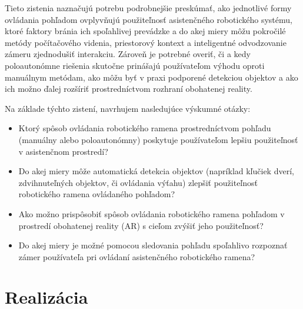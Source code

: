\documentclass[11pt,english,a4paper]{article}
\begin{document}
Tieto zistenia naznačujú potrebu podrobnejšie preskúmať, ako jednotlivé formy ovládania pohľadom ovplyvňujú použiteľnosť asistenčného robotického systému, ktoré faktory bránia ich spoľahlivej prevádzke a do akej miery môžu pokročilé metódy počítačového videnia, priestorový kontext a inteligentné odvodzovanie zámeru zjednodušiť interakciu. Zároveň je potrebné overiť, či a kedy poloautonómne riešenia skutočne prinášajú používateľom výhodu oproti manuálnym metódam, ako môžu byť v praxi podporené detekciou objektov a ako ich možno ďalej rozšíriť prostredníctvom rozhraní obohatenej reality.


\noindent
Na základe týchto zistení, navrhujem nasledujúce výskumné otázky:
\begin{sloppypar}
\begin{itemize}
        \item  Ktorý  spôsob  ovládania  robotického  ramena  prostredníctvom  pohľadu  (manuálny  alebo  poloautonómny)  poskytuje  používateľom  lepšiu  použiteľnosť  v  asistenčnom  prostredí?
        \item  Do  akej  miery  môže  automatická  detekcia  objektov  (napríklad  kľučiek  dverí,  zdvihnuteľných  objektov,  či  ovládania  výťahu)  zlepšiť  použiteľnosť  robotického  ramena  ovládaného  pohľadom?
        \item  Ako  možno  prispôsobiť  spôsob  ovládania  robotického  ramena  pohľadom  v  prostredí  obohatenej  reality  (AR)  s  cieľom  zvýšiť  jeho  použiteľnosť?
        \item  Do  akej  miery  je  možné  pomocou  sledovania  pohľadu  spoľahlivo  rozpoznať  zámer  používateľa  pri  ovládaní  asistenčného  robotického  ramena?
\end{itemize}
\end{sloppypar}


\section{Realizácia}  \label{sec:realization}
\end{document}

